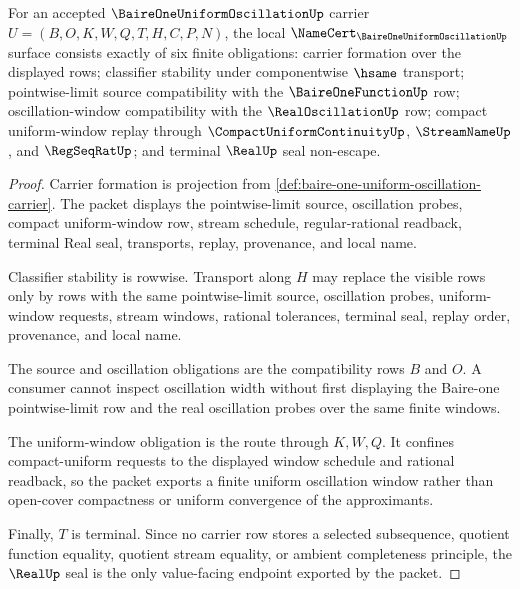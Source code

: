 \begin{theorem}
\label{thm:baire-one-uniform-oscillation-obligations}
For an accepted $\BaireOneUniformOscillationUp$ carrier $U=(B,O,K,W,Q,T,H,C,P,N)$, the local $\NameCert_{\BaireOneUniformOscillationUp}$ surface consists exactly of six finite obligations: carrier formation over the displayed rows; classifier stability under componentwise $\hsame$ transport; pointwise-limit source compatibility with the $\BaireOneFunctionUp$ row; oscillation-window compatibility with the $\RealOscillationUp$ row; compact uniform-window replay through $\CompactUniformContinuityUp$, $\StreamNameUp$, and $\RegSeqRatUp$; and terminal $\RealUp$ seal non-escape.
\end{theorem}
\begin{proof}
Carrier formation is projection from \autoref{def:baire-one-uniform-oscillation-carrier}. The packet displays the pointwise-limit source, oscillation probes, compact uniform-window row, stream schedule, regular-rational readback, terminal Real seal, transports, replay, provenance, and local name.

Classifier stability is rowwise. Transport along $H$ may replace the visible rows only by rows with the same pointwise-limit source, oscillation probes, uniform-window requests, stream windows, rational tolerances, terminal seal, replay order, provenance, and local name.

The source and oscillation obligations are the compatibility rows $B$ and $O$. A consumer cannot inspect oscillation width without first displaying the Baire-one pointwise-limit row and the real oscillation probes over the same finite windows.

The uniform-window obligation is the route through $K,W,Q$. It confines compact-uniform requests to the displayed window schedule and rational readback, so the packet exports a finite uniform oscillation window rather than open-cover compactness or uniform convergence of the approximants.

Finally, $T$ is terminal. Since no carrier row stores a selected subsequence, quotient function equality, quotient stream equality, or ambient completeness principle, the $\RealUp$ seal is the only value-facing endpoint exported by the packet.
\end{proof}

